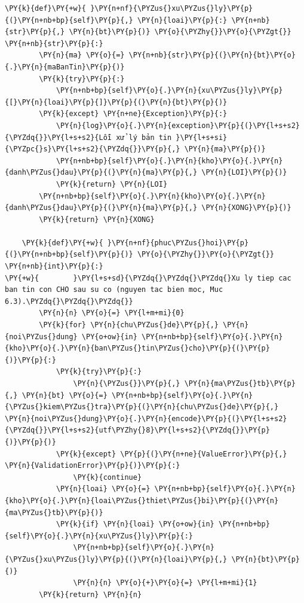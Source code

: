\begin{Verbatim}[commandchars=\\\{\},frame=single,framerule=0.3pt,rulecolor=\color{black!40},fontsize=\footnotesize,breaklines=true]
    \PY{k}{def}\PY{+w}{ }\PY{n+nf}{\PYZus{}xu\PYZus{}ly}\PY{p}{(}\PY{n+nb+bp}{self}\PY{p}{,} \PY{n}{loai}\PY{p}{:} \PY{n+nb}{str}\PY{p}{,} \PY{n}{bt}\PY{p}{)} \PY{o}{\PYZhy{}}\PY{o}{\PYZgt{}} \PY{n+nb}{str}\PY{p}{:}
        \PY{n}{ma} \PY{o}{=} \PY{n+nb}{str}\PY{p}{(}\PY{n}{bt}\PY{o}{.}\PY{n}{maBanTin}\PY{p}{)}
        \PY{k}{try}\PY{p}{:}
            \PY{n+nb+bp}{self}\PY{o}{.}\PY{n}{xu\PYZus{}ly}\PY{p}{[}\PY{n}{loai}\PY{p}{]}\PY{p}{(}\PY{n}{bt}\PY{p}{)}
        \PY{k}{except} \PY{n+ne}{Exception}\PY{p}{:}
            \PY{n}{log}\PY{o}{.}\PY{n}{exception}\PY{p}{(}\PY{l+s+s2}{\PYZdq{}}\PY{l+s+s2}{Lỗi xử lý bản tin }\PY{l+s+si}{\PYZpc{}s}\PY{l+s+s2}{\PYZdq{}}\PY{p}{,} \PY{n}{ma}\PY{p}{)}
            \PY{n+nb+bp}{self}\PY{o}{.}\PY{n}{kho}\PY{o}{.}\PY{n}{danh\PYZus{}dau}\PY{p}{(}\PY{n}{ma}\PY{p}{,} \PY{n}{LOI}\PY{p}{)}
            \PY{k}{return} \PY{n}{LOI}
        \PY{n+nb+bp}{self}\PY{o}{.}\PY{n}{kho}\PY{o}{.}\PY{n}{danh\PYZus{}dau}\PY{p}{(}\PY{n}{ma}\PY{p}{,} \PY{n}{XONG}\PY{p}{)}
        \PY{k}{return} \PY{n}{XONG}

    \PY{k}{def}\PY{+w}{ }\PY{n+nf}{phuc\PYZus{}hoi}\PY{p}{(}\PY{n+nb+bp}{self}\PY{p}{)} \PY{o}{\PYZhy{}}\PY{o}{\PYZgt{}} \PY{n+nb}{int}\PY{p}{:}
\PY{+w}{        }\PY{l+s+sd}{\PYZdq{}\PYZdq{}\PYZdq{}Xu ly tiep cac ban tin con CHO sau su co (nguyen tac bien moc, Muc 6.3).\PYZdq{}\PYZdq{}\PYZdq{}}
        \PY{n}{n} \PY{o}{=} \PY{l+m+mi}{0}
        \PY{k}{for} \PY{n}{chu\PYZus{}de}\PY{p}{,} \PY{n}{noi\PYZus{}dung} \PY{o+ow}{in} \PY{n+nb+bp}{self}\PY{o}{.}\PY{n}{kho}\PY{o}{.}\PY{n}{ban\PYZus{}tin\PYZus{}cho}\PY{p}{(}\PY{p}{)}\PY{p}{:}
            \PY{k}{try}\PY{p}{:}
                \PY{n}{\PYZus{}}\PY{p}{,} \PY{n}{ma\PYZus{}tb}\PY{p}{,} \PY{n}{bt} \PY{o}{=} \PY{n+nb+bp}{self}\PY{o}{.}\PY{n}{\PYZus{}kiem\PYZus{}tra}\PY{p}{(}\PY{n}{chu\PYZus{}de}\PY{p}{,} \PY{n}{noi\PYZus{}dung}\PY{o}{.}\PY{n}{encode}\PY{p}{(}\PY{l+s+s2}{\PYZdq{}}\PY{l+s+s2}{utf\PYZhy{}8}\PY{l+s+s2}{\PYZdq{}}\PY{p}{)}\PY{p}{)}
            \PY{k}{except} \PY{p}{(}\PY{n+ne}{ValueError}\PY{p}{,} \PY{n}{ValidationError}\PY{p}{)}\PY{p}{:}
                \PY{k}{continue}
            \PY{n}{loai} \PY{o}{=} \PY{n+nb+bp}{self}\PY{o}{.}\PY{n}{kho}\PY{o}{.}\PY{n}{loai\PYZus{}thiet\PYZus{}bi}\PY{p}{(}\PY{n}{ma\PYZus{}tb}\PY{p}{)}
            \PY{k}{if} \PY{n}{loai} \PY{o+ow}{in} \PY{n+nb+bp}{self}\PY{o}{.}\PY{n}{xu\PYZus{}ly}\PY{p}{:}
                \PY{n+nb+bp}{self}\PY{o}{.}\PY{n}{\PYZus{}xu\PYZus{}ly}\PY{p}{(}\PY{n}{loai}\PY{p}{,} \PY{n}{bt}\PY{p}{)}
                \PY{n}{n} \PY{o}{+}\PY{o}{=} \PY{l+m+mi}{1}
        \PY{k}{return} \PY{n}{n}
\end{Verbatim}
